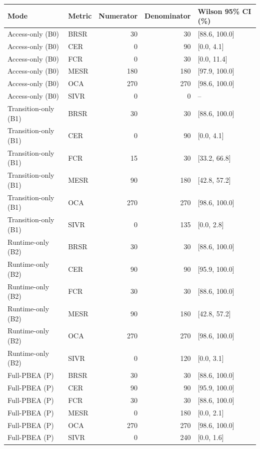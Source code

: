 \begin{tabular}{llrrl}
\toprule
Mode & Metric & Numerator & Denominator & Wilson 95\% CI (\%) \\
\midrule
Access-only (B0) & BRSR & 30 & 30 & [88.6, 100.0] \\
Access-only (B0) & CER & 0 & 90 & [0.0, 4.1] \\
Access-only (B0) & FCR & 0 & 30 & [0.0, 11.4] \\
Access-only (B0) & MESR & 180 & 180 & [97.9, 100.0] \\
Access-only (B0) & OCA & 270 & 270 & [98.6, 100.0] \\
Access-only (B0) & SIVR & 0 & 0 & -- \\
Transition-only (B1) & BRSR & 30 & 30 & [88.6, 100.0] \\
Transition-only (B1) & CER & 0 & 90 & [0.0, 4.1] \\
Transition-only (B1) & FCR & 15 & 30 & [33.2, 66.8] \\
Transition-only (B1) & MESR & 90 & 180 & [42.8, 57.2] \\
Transition-only (B1) & OCA & 270 & 270 & [98.6, 100.0] \\
Transition-only (B1) & SIVR & 0 & 135 & [0.0, 2.8] \\
Runtime-only (B2) & BRSR & 30 & 30 & [88.6, 100.0] \\
Runtime-only (B2) & CER & 90 & 90 & [95.9, 100.0] \\
Runtime-only (B2) & FCR & 30 & 30 & [88.6, 100.0] \\
Runtime-only (B2) & MESR & 90 & 180 & [42.8, 57.2] \\
Runtime-only (B2) & OCA & 270 & 270 & [98.6, 100.0] \\
Runtime-only (B2) & SIVR & 0 & 120 & [0.0, 3.1] \\
Full-PBEA (P) & BRSR & 30 & 30 & [88.6, 100.0] \\
Full-PBEA (P) & CER & 90 & 90 & [95.9, 100.0] \\
Full-PBEA (P) & FCR & 30 & 30 & [88.6, 100.0] \\
Full-PBEA (P) & MESR & 0 & 180 & [0.0, 2.1] \\
Full-PBEA (P) & OCA & 270 & 270 & [98.6, 100.0] \\
Full-PBEA (P) & SIVR & 0 & 240 & [0.0, 1.6] \\
\bottomrule
\end{tabular}
